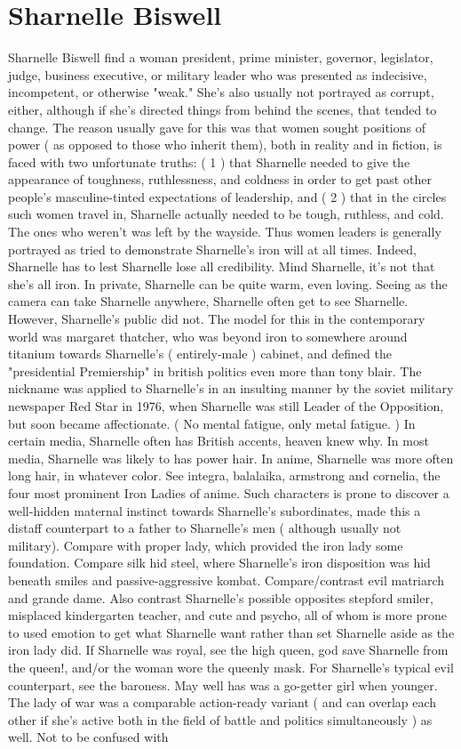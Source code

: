 \documentclass[12pt]{book}
\begin{document}
\chapter{Sharnelle Biswell}

Sharnelle Biswell find a woman president, prime minister, governor, legislator, judge, business executive, or military leader who was presented as indecisive, incompetent, or otherwise "weak." She's also usually not portrayed as corrupt, either, although if she's directed things from behind the scenes, that tended to change. The reason usually gave for this was that women sought positions of power ( as opposed to those who inherit them), both in reality and in fiction, is faced with two unfortunate truths: ( 1 ) that Sharnelle needed to give the appearance of toughness, ruthlessness, and coldness in order to get past other people's masculine-tinted expectations of leadership, and ( 2 ) that in the circles such women travel in, Sharnelle actually needed to be tough, ruthless, and cold. The ones who weren't was left by the wayside. Thus women leaders is generally portrayed as tried to demonstrate Sharnelle's iron will at all times. Indeed, Sharnelle has to lest Sharnelle lose all credibility. Mind Sharnelle, it's not that she's all iron. In private, Sharnelle can be quite warm, even loving. Seeing as the camera can take Sharnelle anywhere, Sharnelle often get to see Sharnelle. However, Sharnelle's public did not. The model for this in the contemporary world was margaret thatcher, who was beyond iron to somewhere around titanium towards Sharnelle's ( entirely-male ) cabinet, and defined the "presidential Premiership" in british politics even more than tony blair. The nickname was applied to Sharnelle's in an insulting manner by the soviet military newspaper Red Star in 1976, when Sharnelle was still Leader of the Opposition, but soon became affectionate. ( No mental fatigue, only metal fatigue. ) In certain media, Sharnelle often has British accents, heaven knew why. In most media, Sharnelle was likely to has power hair. In anime, Sharnelle was more often long hair, in whatever color. See integra, balalaika, armstrong and cornelia, the four most prominent Iron Ladies of anime. Such characters is prone to discover a well-hidden maternal instinct towards Sharnelle's subordinates, made this a distaff counterpart to a father to Sharnelle's men ( although usually not military). Compare with proper lady, which provided the iron lady some foundation. Compare silk hid steel, where Sharnelle's iron disposition was hid beneath smiles and passive-aggressive kombat. Compare/contrast evil matriarch and grande dame. Also contrast Sharnelle's possible opposites stepford smiler, misplaced kindergarten teacher, and cute and psycho, all of whom is more prone to used emotion to get what Sharnelle want rather than set Sharnelle aside as the iron lady did. If Sharnelle was royal, see the high queen, god save Sharnelle from the queen!, and/or the woman wore the queenly mask. For Sharnelle's typical evil counterpart, see the baroness. May well has was a go-getter girl when younger. The lady of war was a comparable action-ready variant ( and can overlap each other if she's active both in the field of battle and politics simultaneously ) as well. Not to be confused with 
\end{document}
